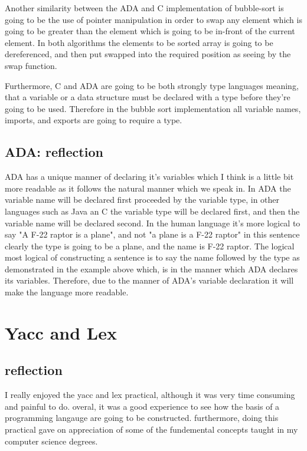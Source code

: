 \documentclass[
	12pt, %
]{fphw}
\begin{document}
Another similarity between the ADA and C implementation of bubble-sort is going
to be the use of pointer manipulation in order to swap any element which is
going to be greater than the element which is going to be in-front of the current
element. In both algorithms the elements to be sorted array is going to be
dereferenced, and then put swapped into the required position as seeing by the
swap function.\par


Furthermore, C and ADA are going to be both strongly type languages meaning,
that a variable or a data structure must be declared with a type before they're
going to be used. Therefore in the bubble sort implementation all variable names,
imports, and exports are going to require a type.

\subsection{ADA: reflection}
ADA has a unique manner of declaring it's variables which I think is a little bit
more readable as it follows the natural manner which we speak in. In ADA the variable
name will be declared first proceeded by the variable type, in other languages
such as Java an C the variable type will be declared first, and then the variable
name will be declared second. In the human language it's more logical to say
"A F-22 raptor is a plane", and not "a plane is a F-22 raptor" in this sentence
clearly the type is going to be a plane, and the name is F-22 raptor. The logical
most logical of constructing a sentence is to say the name followed by the type as
demonstrated in the example above which, is in the manner which ADA declares its
variables. Therefore, due to the manner of ADA's variable declaration  it will
make the language more readable.

\section{Yacc and Lex}


\subsection{reflection}
I really enjoyed the yacc and lex practical, although it was very time consuming
and painful to do. overal, it was a good experience to see how the basis of
a programming langauge are going to be constructed. furthermore, doing this
practical gave on appreciation of some of the fundemental concepts taught in my
computer science degrees.\par
\end{document}
